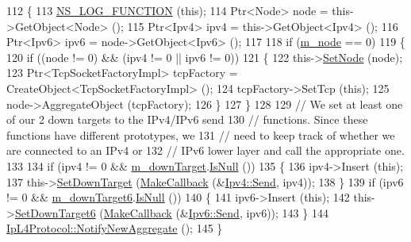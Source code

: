 \begin{DoxyCode}
112 \{
113   \hyperlink{log-macros-disabled_8h_a90b90d5bad1f39cb1b64923ea94c0761}{NS\_LOG\_FUNCTION} (\textcolor{keyword}{this});
114   Ptr<Node> node = this->GetObject<Node> ();
115   Ptr<Ipv4> ipv4 = this->GetObject<Ipv4> ();
116   Ptr<Ipv6> ipv6 = node->GetObject<Ipv6> ();
117 
118   \textcolor{keywordflow}{if} (\hyperlink{classns3_1_1TcpL4Protocol_a89e39fd5367f8ce22565f69e224de189}{m\_node} == 0)
119     \{
120       \textcolor{keywordflow}{if} ((node != 0) && (ipv4 != 0 || ipv6 != 0))
121         \{
122           this->\hyperlink{classns3_1_1TcpL4Protocol_a092de53315ed89dfa2080ef0d92ccd56}{SetNode} (node);
123           Ptr<TcpSocketFactoryImpl> tcpFactory = CreateObject<TcpSocketFactoryImpl> ();
124           tcpFactory->SetTcp (\textcolor{keyword}{this});
125           node->AggregateObject (tcpFactory);
126         \}
127     \}
128 
129   \textcolor{comment}{// We set at least one of our 2 down targets to the IPv4/IPv6 send}
130   \textcolor{comment}{// functions.  Since these functions have different prototypes, we}
131   \textcolor{comment}{// need to keep track of whether we are connected to an IPv4 or}
132   \textcolor{comment}{// IPv6 lower layer and call the appropriate one.}
133 
134   \textcolor{keywordflow}{if} (ipv4 != 0 && \hyperlink{classns3_1_1TcpL4Protocol_a6624133b0d5072cacbd77c9dc90aee75}{m\_downTarget}.\hyperlink{classns3_1_1Callback_aa8e27826badbf37f84763f36f70d9b54}{IsNull} ())
135     \{
136       ipv4->Insert (\textcolor{keyword}{this});
137       this->\hyperlink{classns3_1_1TcpL4Protocol_aa29220d10741bf33a6d95ce9a985971f}{SetDownTarget} (\hyperlink{group__makecallbackmemptr_ga9376283685aa99d204048d6a4b7610a4}{MakeCallback} (&\hyperlink{classns3_1_1Ipv4_a81f6cbb774cdc255e3e49490e0960539}{Ipv4::Send}, ipv4));
138     \}
139   \textcolor{keywordflow}{if} (ipv6 != 0 && \hyperlink{classns3_1_1TcpL4Protocol_ae4447ef1e9b58f1352b819a9c6fff496}{m\_downTarget6}.\hyperlink{classns3_1_1Callback_aa8e27826badbf37f84763f36f70d9b54}{IsNull} ())
140     \{
141       ipv6->Insert (\textcolor{keyword}{this});
142       this->\hyperlink{classns3_1_1TcpL4Protocol_ae35e768fcbb81c201c695ba4fbbeab1d}{SetDownTarget6} (\hyperlink{group__makecallbackmemptr_ga9376283685aa99d204048d6a4b7610a4}{MakeCallback} (&\hyperlink{classns3_1_1Ipv6_a2aad308983b20eb54334bb0d3db31004}{Ipv6::Send}, ipv6));
143     \}
144   \hyperlink{classns3_1_1Object_a1bd7211125185a6cd511c35fea4e500f}{IpL4Protocol::NotifyNewAggregate} ();
145 \}
\end{DoxyCode}


